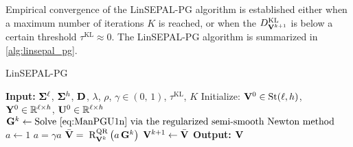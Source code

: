 Empirical convergence of the LinSEPAL-PG algorithm is established either when a maximum number of iterations $K$ is reached, or when the $D^{\mathrm{KL}}_{\mathbf{V}^{k+1}}$ is below a certain threshold $\tau^{\mathrm{KL}}\approx 0$.
The LinSEPAL-PG algorithm is summarized in \cref{alg:linsepal_pg}.

\begin{algorithm}[H]
\caption{LinSEPAL-PG}
\label{alg:linsepal_pg}
\begin{algorithmic}[1]
\STATE \textbf{Input:} $\boldsymbol{\Sigma}^{\ell}$, $\boldsymbol{\Sigma}^{h}$, $\mathbf{D}$, $\lambda$, $\rho$, $\gamma \in (0,\,1)$, $\tau^{\mathrm{KL}}$, $K$
\STATE Initialize: $\mathbf{V}^0 \in \mathrm{St}({\ell},{h})$, $\mathbf{Y}^0 \in \mathbb{R}^{\ell \times h}$, $\mathbf{U}^0 \in \mathbb{R}^{\ell \times h}$
\REPEAT
    \STATE $\G^{k} \gets \text{Solve \cref{eq:ManPGU1n} via the regularized semi-smooth Newton method}$ 
    \STATE $a \gets 1$
    \REPEAT
        \STATE $a = \gamma a$
        \STATE $\bar{\mathbf{V}} = \;\mathrm{R}^{\mathrm{QR}}_{\mathbf{V}^k}\left( a\,\mathbf{G}^k \right)$
    \STATE $\mathbf{V}^{k+1} \gets \bar{\mathbf{V}}$
\STATE \textbf{Output:} $\mathbf{V}$
\end{algorithmic}
\end{algorithm} 
